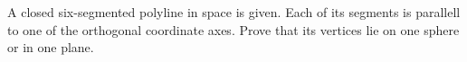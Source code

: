 \problem
A closed six-segmented polyline in space is given.
Each of its segments is parallell to one of the orthogonal coordinate axes.
Prove that its vertices lie on one sphere or in one plane.
\solution
\endproblem
